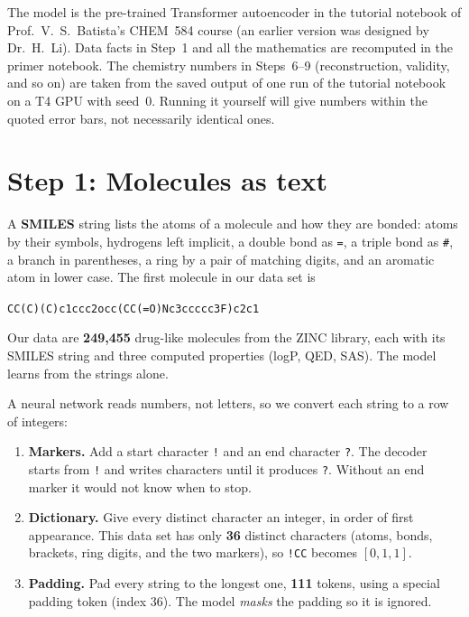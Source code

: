 \documentclass[11pt]{article}
\begin{document}
\begin{keybox}
The model is the pre-trained Transformer autoencoder in the tutorial notebook of Prof.\ V.~S.~Batista's CHEM~584 course (an earlier version was designed by Dr.\ H.~Li). Data facts in Step~1 and all the mathematics are recomputed in the primer notebook. The chemistry numbers in Steps~6--9 (reconstruction, validity, and so on) are taken from the saved output of one run of the tutorial notebook on a T4 GPU with seed~0. Running it yourself will give numbers within the quoted error bars, not necessarily identical ones.
\end{keybox}

\section{Step 1: Molecules as text}
A \textbf{SMILES} string lists the atoms of a molecule and how they are bonded: atoms by their symbols, hydrogens left implicit, a double bond as \texttt{=}, a triple bond as \texttt{\#}, a branch in parentheses, a ring by a pair of matching digits, and an aromatic atom in lower case. The first molecule in our data set is
\begin{center}
\texttt{CC(C)(C)c1ccc2occ(CC(=O)Nc3ccccc3F)c2c1}
\end{center}
Our data are \textbf{249{,}455} drug-like molecules from the ZINC library, each with its SMILES string and three computed properties (logP, QED, SAS). The model learns from the strings alone.

A neural network reads numbers, not letters, so we convert each string to a row of integers:
\begin{enumerate}[nosep]
  \item \textbf{Markers.} Add a start character \texttt{!} and an end character \texttt{?}. The decoder starts from \texttt{!} and writes characters until it produces \texttt{?}. Without an end marker it would not know when to stop.
  \item \textbf{Dictionary.} Give every distinct character an integer, in order of first appearance. This data set has only \textbf{36} distinct characters (atoms, bonds, brackets, ring digits, and the two markers), so \texttt{!CC} becomes $[0,1,1]$.
  \item \textbf{Padding.} Pad every string to the longest one, \textbf{111} tokens, using a special padding token (index 36). The model \emph{masks} the padding so it is ignored.
\end{enumerate}
\end{document}
